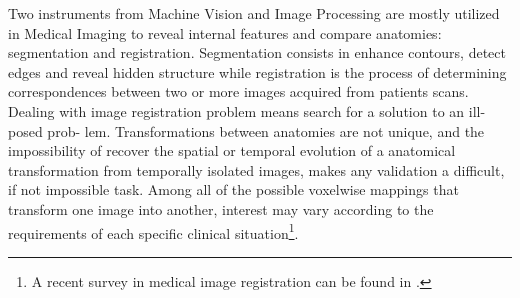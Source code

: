 Two instruments from Machine Vision and Image Processing are mostly utilized in Medical Imaging to reveal internal features and compare anatomies: segmentation and registration. Segmentation consists in enhance contours, detect edges and reveal hidden structure while registration is the process of determining correspondences between two or more images acquired from patients scans.\\
Dealing with image registration problem means search for a solution to an ill-posed prob- lem. Transformations between anatomies are not unique, and the impossibility of recover the spatial or temporal evolution of a anatomical transformation from temporally isolated images, makes any validation a difficult, if not impossible task. Among all of the possible voxelwise mappings that transform one image into another, interest may vary according to the requirements of each specific clinical situation\footnote{A recent survey in medical image registration can be found in \cite{Sotiras:survey:13}.}.\\
%
%
%
